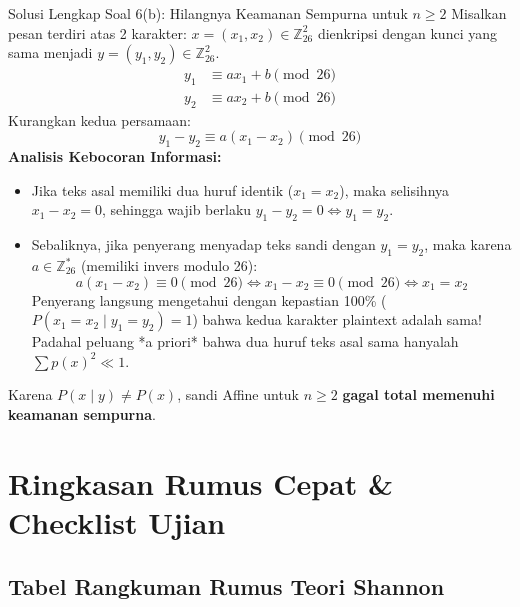 \documentclass[11pt,a4paper]{article}
\begin{document}
\begin{solusibox}{Solusi Lengkap Soal 6(b): Hilangnya Keamanan Sempurna untuk $n \ge 2$}
Misalkan pesan terdiri atas 2 karakter: $x = (x_1, x_2) \in \mathbb{Z}_{26}^2$ dienkripsi dengan kunci yang sama menjadi $y = (y_1, y_2) \in \mathbb{Z}_{26}^2$.
\begin{align*}
y_1 &\equiv ax_1 + b \pmod{26} \\
y_2 &\equiv ax_2 + b \pmod{26}
\end{align*}
Kurangkan kedua persamaan:
\[
y_1 - y_2 \equiv a(x_1 - x_2) \pmod{26}
\]
\textbf{Analisis Kebocoran Informasi:}
\begin{itemize}
    \item Jika teks asal memiliki dua huruf identik ($x_1 = x_2$), maka selisihnya $x_1 - x_2 = 0$, sehingga wajib berlaku $y_1 - y_2 = 0 \iff y_1 = y_2$.
    \item Sebaliknya, jika penyerang menyadap teks sandi dengan $y_1 = y_2$, maka karena $a \in \mathbb{Z}_{26}^*$ (memiliki invers modulo 26):
    \[
    a(x_1 - x_2) \equiv 0 \pmod{26} \iff x_1 - x_2 \equiv 0 \pmod{26} \iff x_1 = x_2
    \]
    Penyerang langsung mengetahui dengan kepastian 100\% ($P(x_1 = x_2 \mid y_1 = y_2) = 1$) bahwa kedua karakter plaintext adalah sama!
    Padahal peluang *a priori* bahwa dua huruf teks asal sama hanyalah $\sum p(x)^2 \ll 1$.
\end{itemize}
Karena $P(x \mid y) \ne P(x)$, sandi Affine untuk $n \ge 2$ \textbf{gagal total memenuhi keamanan sempurna}.
\end{solusibox}

\newpage

\section{Ringkasan Rumus Cepat \& Checklist Ujian}

\subsection{Tabel Rangkuman Rumus Teori Shannon}
\end{document}
